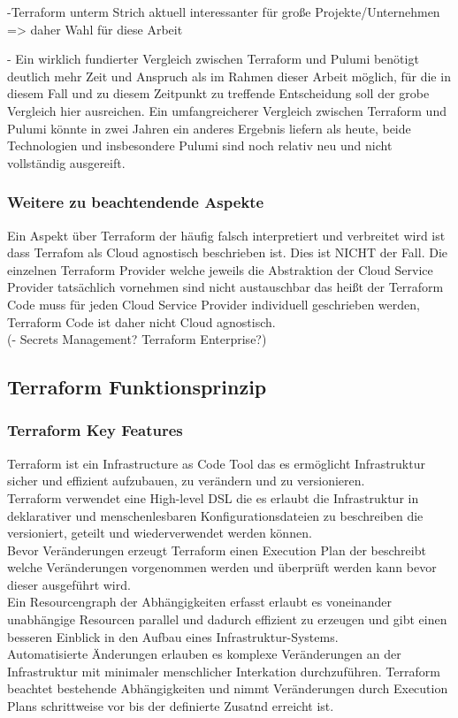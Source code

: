 -Terraform unterm Strich aktuell interessanter für große Projekte/Unternehmen
=> daher Wahl für diese Arbeit

- Ein wirklich fundierter Vergleich zwischen Terraform und Pulumi benötigt
deutlich mehr Zeit und Anspruch als im Rahmen dieser Arbeit möglich, für
die in diesem Fall und zu diesem Zeitpunkt zu treffende Entscheidung soll
der grobe Vergleich hier ausreichen. Ein umfangreicherer Vergleich zwischen
Terraform und Pulumi könnte in zwei Jahren ein anderes Ergebnis liefern
als heute, beide Technologien und insbesondere Pulumi sind noch relativ neu
und nicht vollständig ausgereift.

\subsubsection{Weitere zu beachtendende Aspekte}

Ein Aspekt über Terraform der häufig falsch interpretiert und verbreitet wird
ist dass Terrafom als Cloud agnostisch beschrieben ist. Dies ist NICHT der
Fall. Die einzelnen Terraform Provider welche jeweils die Abstraktion der
Cloud Service Provider tatsächlich vornehmen sind nicht austauschbar das heißt
der Terraform Code muss für jeden Cloud Service Provider individuell
geschrieben werden, Terraform Code ist daher nicht Cloud agnostisch.\\

(- Secrets Management? Terraform Enterprise?)

\subsection{Terraform Funktionsprinzip}

\subsubsection{Terraform Key Features}

Terraform ist ein Infrastructure as Code Tool das es ermöglicht Infrastruktur
sicher und effizient aufzubauen, zu verändern und zu versionieren.\\
Terraform verwendet eine High-level DSL die es erlaubt die Infrastruktur in
deklarativer und menschenlesbaren Konfigurationsdateien zu beschreiben die
versioniert, geteilt und wiederverwendet werden können.\\
Bevor Veränderungen erzeugt Terraform einen Execution Plan der beschreibt
welche Veränderungen vorgenommen werden und überprüft werden kann bevor
dieser ausgeführt wird.\\
Ein Resourcengraph der Abhängigkeiten erfasst erlaubt es voneinander
unabhängige Resourcen parallel und dadurch effizient zu erzeugen und gibt
einen besseren Einblick in den Aufbau eines Infrastruktur-Systems.\\
Automatisierte Änderungen erlauben es komplexe Veränderungen an der
Infrastruktur mit minimaler menschlicher Interkation durchzuführen.
Terraform beachtet bestehende Abhängigkeiten und nimmt Veränderungen
durch Execution Plans schrittweise vor bis der definierte Zusatnd erreicht
ist.

